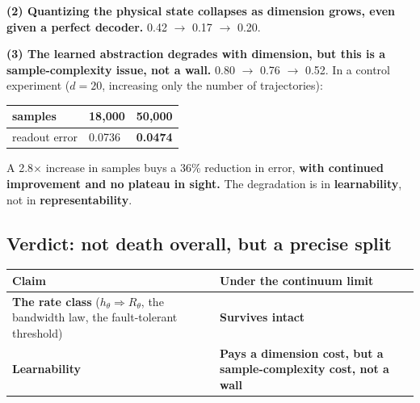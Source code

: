 \documentclass[11pt]{article}
\begin{document}
\textbf{(2) Quantizing the physical state collapses as dimension grows, even given a perfect decoder.} 0.42 \(\rightarrow\) 0.17 \(\rightarrow\) 0.20.

\textbf{(3) The learned abstraction degrades with dimension, but this is a sample-complexity issue, not a wall.} 0.80 \(\rightarrow\) 0.76 \(\rightarrow\) 0.52. In a control experiment (\(d=20\), increasing only the number of trajectories):

\begin{longtable}[]{@{}lll@{}}
\toprule
samples & 18,000 & 50,000\tabularnewline
\midrule
\endhead
readout error & 0.0736 & \textbf{0.0474}\tabularnewline
\bottomrule
\end{longtable}

A 2.8\(\times\) increase in samples buys a 36\% reduction in error, \textbf{with continued improvement and no plateau in sight.} The degradation is in \textbf{learnability}, not in \textbf{representability}.

\hypertarget{verdict-not-death-overall-but-a-precise-split}{%
\subsection{Verdict: not death overall, but a precise split}\label{verdict-not-death-overall-but-a-precise-split}}

\begin{longtable}[]{@{}ll@{}}
\toprule
\begin{minipage}[b]{0.47\columnwidth}\raggedright
Claim\strut
\end{minipage} & \begin{minipage}[b]{0.47\columnwidth}\raggedright
Under the continuum limit\strut
\end{minipage}\tabularnewline
\midrule
\endhead
\begin{minipage}[t]{0.47\columnwidth}\raggedright
\textbf{The rate class} (\(h_\theta\Rightarrow R_\theta\), the bandwidth law, the fault-tolerant threshold)\strut
\end{minipage} & \begin{minipage}[t]{0.47\columnwidth}\raggedright
\textbf{Survives intact}\strut
\end{minipage}\tabularnewline
\begin{minipage}[t]{0.47\columnwidth}\raggedright
\textbf{Learnability}\strut
\end{minipage} & \begin{minipage}[t]{0.47\columnwidth}\raggedright
\textbf{Pays a dimension cost, but a sample-complexity cost, not a wall}\strut
\end{minipage}\tabularnewline
\bottomrule
\end{longtable}
\end{document}
